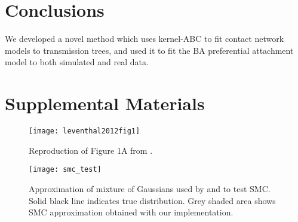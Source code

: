 \documentclass[12pt]{article}\usepackage[]{graphicx}\usepackage[]{color}
\begin{document}
\section*{Conclusions}

We developed a novel method which uses kernel-\gls{ABC} to fit contact network
models to transmission trees, and used it to fit the \gls{BA} preferential
attachment model to both simulated and real data. 

\setcounter{figure}{0}
\renewcommand{\thefigure}{S\arabic{figure}}

\printbibliography

\newpage

\section*{Supplemental Materials}

\begin{figure}[ht]
  \texttt{[image: leventhal2012fig1]}
  \caption{Reproduction of Figure 1A from \textcite{leventhal2012inferring}.}
  \label{fig:sf1}
\end{figure}

\begin{figure}
  \texttt{[image: smc\_test]}
  \caption{Approximation of mixture of Gaussians used by
    \textcite{del2012adaptive} and \textcite{sisson2007sequential} to test
    \gls{SMC}. Solid black line indicates true distribution. Grey shaded area
    shows SMC approximation obtained with our implementation.}
  \label{fig:smctest}
\end{figure}
\end{document}
